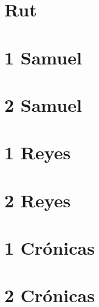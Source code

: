 \chapter{Rut}
\begin{multicols}{2}
  \raggedcolumns
  \parskip=0pt \relax
  
\end{multicols}

\chapter{1 Samuel}
\begin{multicols}{2}
  \raggedcolumns
  \parskip=0pt \relax
  
\end{multicols}

\chapter{2 Samuel}
\begin{multicols}{2}
  \raggedcolumns
  \parskip=0pt \relax
  
\end{multicols}

\chapter{1 Reyes}
\begin{multicols}{2}
  \raggedcolumns
  \parskip=0pt \relax
  
\end{multicols}

\chapter{2 Reyes}
\begin{multicols}{2}
  \raggedcolumns
  \parskip=0pt \relax
  
\end{multicols}

\chapter{1 Crónicas}
\begin{multicols}{2}
  \raggedcolumns
  \parskip=0pt \relax
  
\end{multicols}

\chapter{2 Crónicas}
\begin{multicols}{2}
  \raggedcolumns
  \parskip=0pt \relax
  
\end{multicols}

